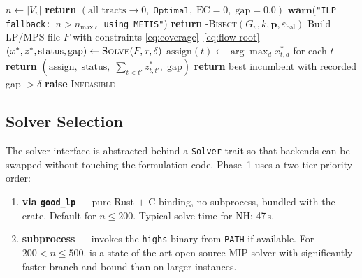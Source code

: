 \begin{algorithm}[t]
\caption{\ilp{}-\textsc{Bisect}($G_v$, $k$, $\mathbf{p}$,
  $\varepsilon_{\mathrm{bal}}$, $\tau$, $\delta$, $n_{\max}$)}
\label{alg:ilp}
\begin{algorithmic}[1]
\State $n \gets |V_v|$
  \textbf{return} $(\text{all tracts} \to 0,\; \texttt{Optimal},\; \text{EC}=0,\; \text{gap}=0.0)$
\EndIf
{}
  \State $\mathbf{warn}$(\texttt{"ILP fallback: $n > n_{\max}$, using METIS"})
  \State \textbf{return} \metis{}-\textsc{Bisect}$(G_v, k, \mathbf{p}, \varepsilon_{\mathrm{bal}})$
\EndIf
\State Build LP/MPS file $F$ with constraints
  \eqref{eq:coverage}--\eqref{eq:flow-root}
\State $(x^*, z^*, \text{status}, \text{gap}) \gets \textsc{Solve}(F, \tau, \delta)$
  \State $\mathrm{assign}(t) \gets \arg\max_d x^*_{t,d}$ for each $t$
  \State \textbf{return} $(\mathrm{assign},\; \text{status},\; \sum_{t<t'} z^*_{t,t'},\; \text{gap})$
  \State \textbf{return} best incumbent with recorded gap $> \delta$
\Else
  \textbf{raise} \textsc{Infeasible}
\EndIf
\end{algorithmic}
\end{algorithm}

\subsection{Solver Selection}

The solver interface is abstracted behind a \texttt{Solver} trait so that
backends can be swapped without touching the formulation code.
Phase~1 uses a two-tier priority order:

\begin{enumerate}
\item \textbf{\glpk{} via \texttt{good\_lp}} --- pure Rust $+$ C binding,
  no subprocess, bundled with the crate.
  Default for $n \leq 200$.
  Typical solve time for NH: 47\,s.

\item \textbf{\highs{} subprocess} --- invokes the \texttt{highs} binary
  from \texttt{PATH} if available.
  For $200 < n \leq 500$.
  \highs{} is a state-of-the-art open-source MIP solver with significantly
  faster branch-and-bound than \glpk{} on larger instances.
\end{enumerate}

